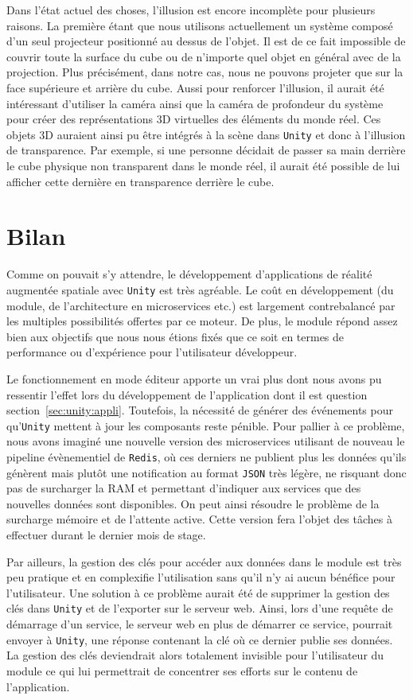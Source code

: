 Dans l'état actuel des choses, l'illusion est encore incomplète pour plusieurs raisons. La première étant que nous utilisons actuellement un système composé d'un seul projecteur positionné au dessus de l'objet. Il est de ce fait impossible de couvrir toute la surface du cube ou de n'importe quel objet en général avec de la projection. Plus précisément, dans notre cas, nous ne pouvons projeter que sur la face supérieure et arrière du cube. Aussi pour renforcer l'illusion, il aurait été intéressant d'utiliser la caméra ainsi que la caméra de profondeur du système pour créer des représentations 3D virtuelles des éléments du monde réel. Ces objets 3D auraient ainsi pu être intégrés à la scène dans \texttt{Unity} et donc à l'illusion de transparence. Par exemple, si une personne décidait de passer sa main derrière le cube physique non transparent dans le monde réel, il aurait été possible de lui afficher cette dernière en transparence derrière le cube.

\section{Bilan}
Comme on pouvait s'y attendre, le développement d'applications de réalité augmentée spatiale avec \texttt{Unity} est très agréable. Le coût en développement (du module, de l'architecture en microservices etc.) est largement contrebalancé par les multiples possibilités offertes par ce moteur. De plus, le module répond assez bien aux objectifs que nous nous étions fixés que ce soit en termes de performance ou d'expérience pour l'utilisateur développeur.

Le fonctionnement en mode éditeur apporte un vrai plus dont nous avons pu ressentir l'effet lors du développement de l'application dont il est question section~\ref{sec:unity:appli}. Toutefois, la nécessité de générer des événements pour qu'\texttt{Unity} mettent à jour les composants reste pénible. Pour pallier à ce problème, nous avons imaginé une nouvelle version des microservices utilisant de nouveau le pipeline évènementiel de \texttt{Redis}, où ces derniers ne publient plus les données qu'ils génèrent mais plutôt une notification au format \texttt{JSON}\cite{crockford2006application} très légère, ne risquant donc pas de surcharger la RAM et permettant d'indiquer aux services que des nouvelles données sont disponibles. On peut ainsi résoudre le problème de la surcharge mémoire et de l'attente active. Cette version fera l'objet des tâches à effectuer durant le dernier mois de stage.

Par ailleurs, la gestion des clés pour accéder aux données dans le module est très peu pratique et en complexifie l'utilisation sans qu'il n'y ai aucun bénéfice pour l'utilisateur. Une solution à ce problème aurait été de supprimer la gestion des clés dans \texttt{Unity} et de l'exporter sur le serveur web. Ainsi, lors d'une requête de démarrage d'un service, le serveur web en plus de démarrer ce service, pourrait envoyer à \texttt{Unity}, une réponse contenant la clé où ce dernier publie ses données. La gestion des clés deviendrait alors totalement invisible pour l'utilisateur du module ce qui lui permettrait de concentrer ses efforts sur le contenu de l'application.